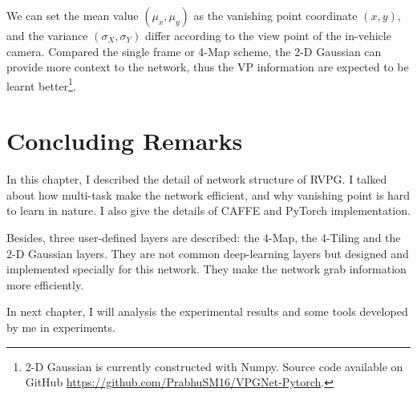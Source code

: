 \begin{spacing}{1.5}
We can set the mean value $(\mu_x,\mu_y)$ as the vanishing point coordinate $(x,y)$, and the variance $(\sigma_X,\sigma_Y)$ differ according to the view point of the in-vehicle camera. Compared the single frame or 4-Map scheme, the 2-D Gaussian can provide more context to the network, thus the VP information are expected to be learnt better\footnote{2-D Gaussian is currently constructed with Numpy. Source code available on GitHub \url{https://github.com/PrabhuSM16/VPGNet-Pytorch}.}.

\section{Concluding Remarks}

In this chapter, I described the detail of network structure of RVPG. I talked about how multi-task make the network efficient, and why vanishing point is hard to learn in nature. I also give the details of CAFFE and PyTorch implementation.

Besides, three user-defined layers are described: the 4-Map, the 4-Tiling and the 2-D Gaussian layers. They are not common deep-learning layers but designed and implemented specially for this network. They make the network grab information more efficiently.

In next chapter, I will analysis the experimental results and some tools developed by me in experiments.

\end{spacing}
\newpage
